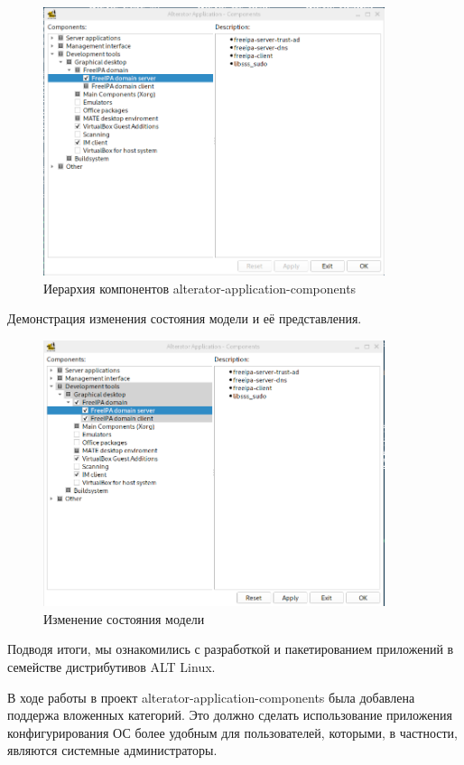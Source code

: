\documentclass[bachelor, och, pract]{SCWorks}
\begin{document}
\begin{figure}[!ht]
	\centering
	\includegraphics[width=10cm]{ierarchy.png}
	\caption{\label{fig:f2}%
	Иерархия компонентов alterator-application-components}
\end{figure}

Демонстрация изменения состояния модели и её представления.

\begin{figure}[!ht]
	\centering
	\includegraphics[width=10cm]{ierarchy-changed.png}
	\caption{\label{fig:f2}%
	Изменение состояния модели}
\end{figure}

\newpage

\conclusion

Подводя итоги, мы ознакомились с разработкой и пакетированием приложений в семействе дистрибутивов ALT Linux.

В ходе работы в проект alterator-application-components была добавлена поддержа вложенных категорий.
Это должно сделать использование приложения конфигурирования ОС более удобным для пользователей, которыми, в частности, являются системные администраторы.
\end{document}
